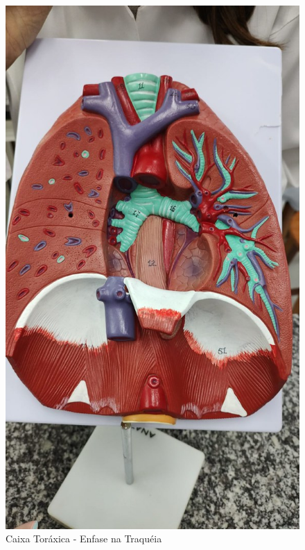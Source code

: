 \documentclass[
]{book}
\begin{document}
\begin{figure}

{\centering \includegraphics[width=0.9\linewidth]{figuras/Aula8-3-caixa-toracica-enfase-traqueia} 

}

\caption{Caixa Toráxica - Enfase na Traquéia}\label{fig:unnamed-chunk-18}
\end{figure}
\end{document}
